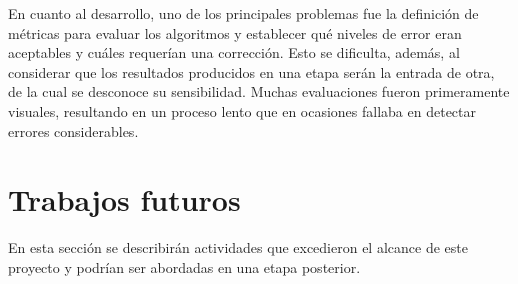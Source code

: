 En cuanto al desarrollo, uno de los principales problemas fue la definición de
métricas para evaluar los algoritmos y establecer qué niveles de error eran
aceptables y cuáles requerían una corrección.
Esto se dificulta, además, al considerar que los resultados producidos en una etapa
serán la entrada de otra, de la cual se desconoce su sensibilidad.
Muchas evaluaciones fueron primeramente visuales, resultando en un proceso lento
que en ocasiones fallaba en detectar errores considerables.



%



\section{Trabajos futuros}
En esta sección se describirán actividades que excedieron el alcance de este proyecto
y podrían ser abordadas en una etapa posterior.

